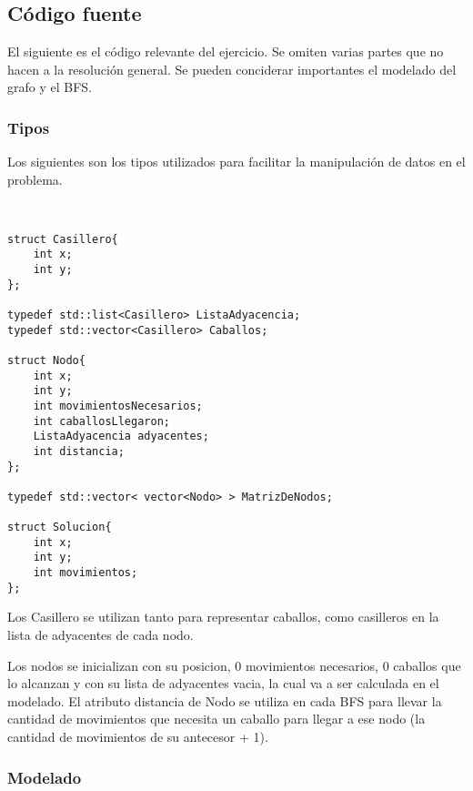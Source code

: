 \subsection{C\'odigo fuente}

El siguiente es el c\'odigo relevante del ejercicio. Se omiten varias partes que no hacen a la resoluci\'on general. Se pueden conciderar importantes el modelado del grafo y el BFS.

\subsubsection{Tipos}
Los siguientes son los tipos utilizados para facilitar la manipulaci\'on de datos en el problema.

\begin{lstlisting}


struct Casillero{
	int x;
	int y;
};

typedef std::list<Casillero> ListaAdyacencia;
typedef std::vector<Casillero> Caballos;

struct Nodo{
	int x;
	int y;
	int movimientosNecesarios;
	int caballosLlegaron;
	ListaAdyacencia adyacentes;
	int distancia;
};

typedef std::vector< vector<Nodo> > MatrizDeNodos;

struct Solucion{
	int x;
	int y;
	int movimientos;
};

\end{lstlisting}

Los Casillero se utilizan tanto para representar caballos, como casilleros en la lista de adyacentes de cada nodo.

Los nodos se inicializan con su posicion, 0 movimientos necesarios, 0 caballos que lo alcanzan y con su lista de adyacentes vacia, la cual va a ser calculada en el modelado. El atributo distancia de Nodo se utiliza en cada BFS para llevar la cantidad de movimientos que necesita un caballo para llegar a ese nodo (la cantidad de movimientos de su antecesor + 1).

\subsubsection{Modelado}

